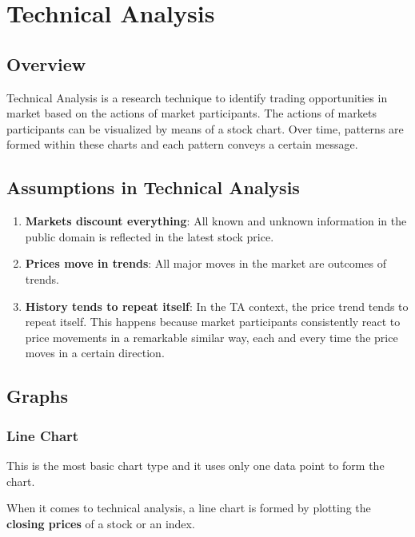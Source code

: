 \chapter{Technical Analysis}

\section{Overview}
Technical Analysis is a research technique to identify trading opportunities in market based on the actions of market participants. The actions of markets participants can be visualized by means of a stock chart. Over time, patterns are formed within these charts and each pattern conveys a certain message.


\section{Assumptions in Technical Analysis}
\begin{enumerate}
  \item \textbf{Markets discount everything}: All known and unknown information in the public domain is reflected in the latest stock price.
  \item \textbf{Prices move in trends}: All major moves in the market are outcomes of trends.
  \item \textbf{History tends to repeat itself}: In the TA context, the price trend tends to repeat itself. This happens because market participants consistently react to price movements in a remarkable similar way, each and every time the price moves in a certain direction.
\end{enumerate}

\section{Graphs}

\subsection{Line Chart}
This is the most basic chart type and it uses only one data point to form the chart.

When it comes to technical analysis, a line chart is formed by plotting the \textbf{closing prices} of a stock or an index.


